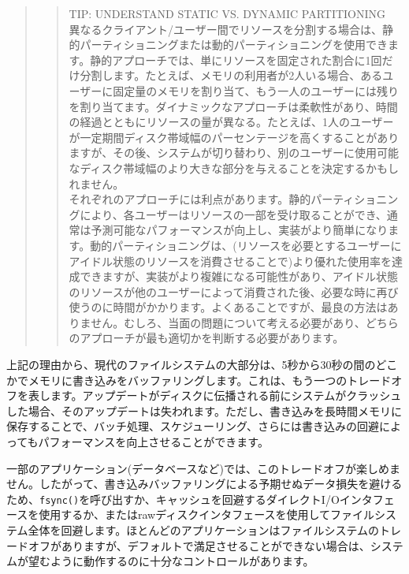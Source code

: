 \begin{quote}
\begin{quote}
TIP: UNDERSTAND STATIC VS. DYNAMIC PARTITIONING\\
異なるクライアント/ユーザー間でリソースを分割する場合は、静的パーティショニングまたは動的パーティショニングを使用できます。静的アプローチでは、単にリソースを固定された割合に1回だけ分割します。たとえば、メモリの利用者が2人いる場合、あるユーザーに固定量のメモリを割り当て、もう一人のユーザーには残りを割り当てます。ダイナミックなアプローチは柔軟性があり、時間の経過とともにリソースの量が異なる。たとえば、1人のユーザーが一定期間ディスク帯域幅のパーセンテージを高くすることがありますが、その後、システムが切り替わり、別のユーザーに使用可能なディスク帯域幅のより大きな部分を与えることを決定するかもしれません。\\
それぞれのアプローチには利点があります。静的パーティショニングにより、各ユーザーはリソースの一部を受け取ることができ、通常は予測可能なパフォーマンスが向上し、実装がより簡単になります。動的パーティショニングは、(リソースを必要とするユーザーにアイドル状態のリソースを消費させることで)より優れた使用率を達成できますが、実装がより複雑になる可能性があり、アイドル状態のリソースが他のユーザーによって消費された後、必要な時に再び使うのに時間がかかります。よくあることですが、最良の方法はありません。むしろ、当面の問題について考える必要があり、どちらのアプローチが最も適切かを判断する必要があります。
\end{quote}
\end{quote}

上記の理由から、現代のファイルシステムの大部分は、5秒から30秒の間のどこかでメモリに書き込みをバッファリングします。これは、もう一つのトレードオフを表します。アップデートがディスクに伝播される前にシステムがクラッシュした場合、そのアップデートは失われます。ただし、書き込みを長時間メモリに保存することで、バッチ処理、スケジューリング、さらには書き込みの回避によってもパフォーマンスを向上させることができます。

一部のアプリケーション(データベースなど)では、このトレードオフが楽しめません。したがって、書き込みバッファリングによる予期せぬデータ損失を避けるため、\texttt{fsync()}を呼び出すか、キャッシュを回避するダイレクトI/Oインタフェースを使用するか、またはrawディスクインタフェースを使用してファイルシステム全体を回避します。ほとんどのアプリケーションはファイルシステムのトレードオフがありますが、デフォルトで満足させることができない場合は、システムが望むように動作するのに十分なコントロールがあります。

